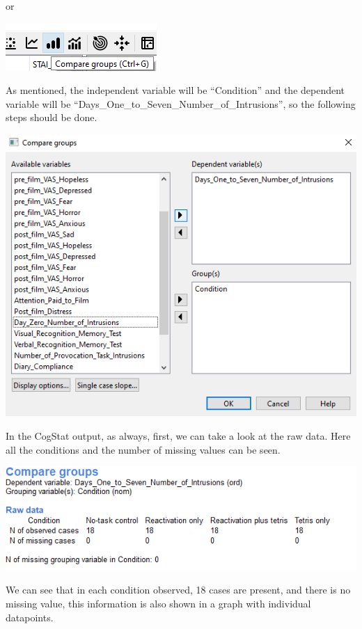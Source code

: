 \documentclass[
]{book}
\begin{document}
or

\includegraphics{img/ch8/8.3comparegroups_icon.png}

As mentioned, the independent variable will be ``Condition'' and the dependent variable will be ``Days\_One\_to\_Seven\_Number\_of\_Intrusions'', so the following steps should be done.

\includegraphics{img/ch8/8.3comparegroups_window.png}

In the CogStat output, as always, first, we can take a look at the raw data. Here all the conditions and the number of missing values can be seen.

\includegraphics{img/ch8/8.3comparegroups_raw.png}

We can see that in each condition observed, 18 cases are present, and there is no missing value, this information is also shown in a graph with individual datapoints.
\end{document}
